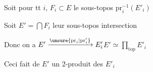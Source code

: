Soit pour tt $i$, $F_i\subset E$ le sous-topos $\mathrm{pr}_i^{-1}(E'_i)$

Soit $E'=\bigcap F_i$ leur sous-topos intersection

Donc on a \qquad $E'\xrightarrow{\unsure{\mathrm{pr}_i|\mathrm{pr}'_i}}E'_i$\qquad $E'\simeq\prod_{\mathrm{top}}E'_i$

Ceci fait de $E'$ un 2-produit des $E'_i$



